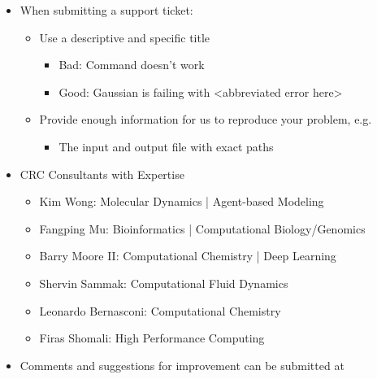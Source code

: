 \documentclass[landscape,a0b,final]{a0poster}
\newcommand{\myurl}[1]{\href{#1}{\color{blue}{#1}}}
\newcommand{\mysection}[1]{
    \begin{center}
        \pbox{0.8\columnwidth}{}{linewidth=3mm,framearc=0.3,linecolor=black,fillstyle=gradient,gradangle=0,gradbegin=white,gradend=white,gradmidpoint=1.0,framesep=0.5em}{
            \begin{center}
                \Large\color{black}{\bf{#1}}
            \end{center}
        }
    \end{center}
    \vspace{0.25cm}
}
\newenvironment{poster}{
  \begin{center}
  \begin{minipage}[c]{0.981\textwidth}
}{
  \end{minipage} 
  \end{center}
}
\newcommand{\pbox}[4]{
\psshadowbox[#3]{
\begin{minipage}[t][#2][t]{#1}
#4
\end{minipage}
}}
\begin{document}
\begin{poster}
\begin{multicols}{3}
    \vspace{0.1cm}
    \mysection{Getting Help}
    \Large    
    \begin{center}
        \begin{itemize}
            \item When submitting a support ticket:
                \begin{itemize}
                    \item Use a descriptive and specific title
                        \begin{itemize}
                            \item Bad: Command doesn't work
                            \item Good: Gaussian is failing with <abbreviated error here>
                        \end{itemize}
                    \item Provide enough information for us to reproduce your problem, e.g.
                        \begin{itemize}
                            \item The input and output file with exact paths
                        \end{itemize}
                \end{itemize}
            \item CRC Consultants with Expertise
                \begin{itemize}
                    \item Kim Wong: Molecular Dynamics | Agent-based Modeling
                    \item Fangping Mu: Bioinformatics | Computational Biology/Genomics
                    \item Barry Moore II: Computational Chemistry | Deep Learning
                    \item Shervin Sammak: Computational Fluid Dynamics
                    \item Leonardo Bernasconi: Computational Chemistry
                    \item Firas Shomali: High Performance Computing
                \end{itemize}
            \item Comments and suggestions for improvement can be submitted at
                \myurl{https://crc.pitt.edu/contact}
        \end{itemize}
    \end{center}


\end{multicols}
\end{poster}
\end{document}
